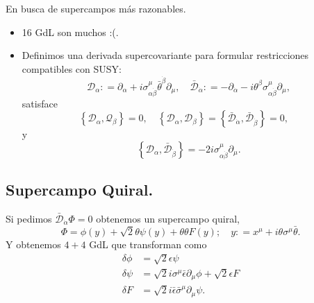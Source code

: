 \documentclass[10pt,a4paper]{beamer}
\begin{document}
\begin{frame}{En busca de supercampos más razonables.}
\begin{itemize}
  \item 16 GdL son muchos :(.
  \item Definimos una derivada supercovariante para formular restricciones
    compatibles con SUSY:
\[
  \mathcal{D}_\alpha : =  \partial_\alpha + i\sigma^\mu_{\alpha\dot\beta}
  \bar\theta^{\dot\beta} \partial_\mu,\quad
  \mathcal{\bar D}_{\dot\alpha} : =  -\partial_{\dot\alpha} - i\theta^{\beta}\sigma^\mu_{\alpha\dot\beta}
   \partial_\mu,
\]
satisface
\[
  \left\{\mathcal{D}_\alpha, \mathcal{Q}_\beta \right\} =0,\quad
  \left\{\mathcal{D}_\alpha, \mathcal{D}_\beta \right\} =  \left\{\mathcal{\bar
  D}_{\dot\alpha}, \mathcal{\bar D}_{\dot\beta } \right\} =0,\quad  
\]
y
\[\left\{\mathcal{D}_\alpha, \mathcal{\bar D}_{\dot\beta }\right\} =
  -2i\sigma^\mu_{\alpha\dot\beta} \partial_\mu.
\]


\end{itemize}
\end{frame}
\subsection{Supercampo Quiral.}
\begin{frame}
Si pedimos $\mathcal{\bar D}_{\dot\alpha} \Phi = 0$ obtenemos un supercampo
quiral,
\[
  \Phi = \phi(y) + \sqrt{2} \theta \psi (y) + \theta \theta F(y); \quad y: = x^\mu + i \theta\sigma^\mu\bar\theta.
\]
Y obtenemos $4+4$ GdL que transforman como
\[
  \begin{aligned}
    \delta \phi &= \sqrt{2}\epsilon \psi\\
    \delta \psi &= \sqrt{2}i\sigma^\mu\bar\epsilon \partial_\mu\phi +
    \sqrt{2}\epsilon F\\
    \delta F    &= \sqrt{2}i\bar\epsilon\bar\sigma^\mu\partial_\mu \psi.
  \end{aligned}
\]


\end{frame}

\end{document}

